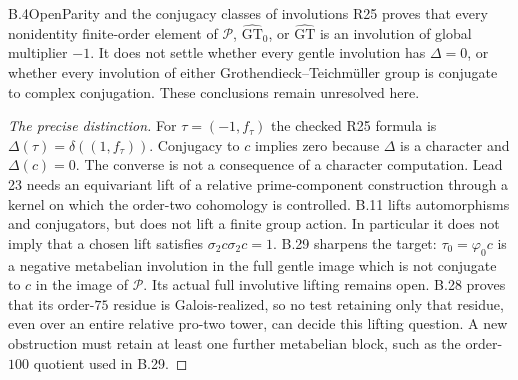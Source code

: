 \begin{statement}{B.4}{Open}{Parity and the conjugacy classes of involutions}
R25 proves that every nonidentity finite-order element of
$\mathcal P$, $\widehat{\mathrm{GT}}_0$, or
$\widehat{\mathrm{GT}}$ is an involution of global multiplier $-1$.
It does not settle whether every gentle involution has $\Delta=0$,
or whether every involution of either Grothendieck--Teichm\"uller
group is conjugate to complex conjugation. These conclusions remain
unresolved here.
\end{statement}
\begin{proof}[The precise distinction]
For $\tau=(-1,f_\tau)$ the checked R25 formula is
$\Delta(\tau)=\delta((1,f_\tau))$. Conjugacy to $c$ implies
zero because $\Delta$ is a character and $\Delta(c)=0$.
The converse is not a consequence of a character computation.
Lead 23 needs an equivariant lift of a relative prime-component
construction through a kernel on which the order-two cohomology
is controlled. B.11 lifts automorphisms and conjugators, but does
not lift a finite group action. In particular it does not imply
that a chosen lift satisfies $\sigma_2c\sigma_2c=1$.
B.29 sharpens the target: $\tau_0=\varphi_0c$ is a negative
metabelian involution in the full gentle image which is not
conjugate to $c$ in the image of $\mathcal P$. Its actual
full involutive lifting remains open. B.28 proves that its
order-$75$ residue is Galois-realized, so no test retaining
only that residue, even over an entire relative pro-two
tower, can decide this lifting question. A new obstruction
must retain at least one further metabelian block, such as
the order-$100$ quotient used in B.29.
\end{proof}

